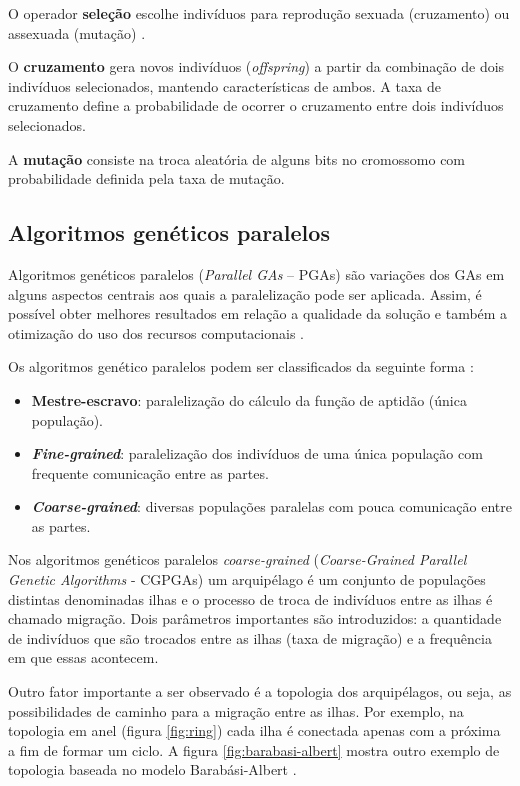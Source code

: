 O operador \textbf{seleção} escolhe indivíduos para reprodução sexuada (cruzamento) ou assexuada (mutação) \cite{erik2012geneticos}.

O \textbf{cruzamento} gera novos indivíduos (\textit{offspring}) a partir da combinação de dois indivíduos selecionados, mantendo características de ambos. A taxa de cruzamento define a probabilidade de ocorrer o cruzamento entre dois indivíduos selecionados.

A \textbf{mutação} consiste na troca aleatória de alguns bits no cromossomo com probabilidade definida pela taxa de mutação.

\subsection{Algoritmos genéticos paralelos}

Algoritmos genéticos paralelos (\textit{Parallel GAs} -- PGAs) \cite{shonkwiler1993parallel} são variações dos GAs em alguns aspectos centrais aos quais a paralelização pode ser aplicada. Assim, é possível obter melhores resultados em relação a qualidade da solução e também a otimização do uso dos recursos computacionais \cite{erik2012geneticos}.

Os algoritmos genético paralelos podem ser classificados da seguinte forma \cite{cantupaz1998asurvey}:

\begin{itemize}
    \item \textbf{Mestre-escravo}: paralelização do cálculo da função de aptidão (única população).
    \item \textbf{\textit{Fine-grained}}: paralelização dos indivíduos de uma única população com frequente comunicação entre as partes.
    \item \textbf{\textit{Coarse-grained}}: diversas populações paralelas com pouca comunicação entre as partes.
\end{itemize}

Nos algoritmos genéticos paralelos \textit{coarse-grained} (\textit{Coarse-Grained Parallel Genetic Algorithms} - CGPGAs) um arquipélago é um conjunto de populações distintas denominadas ilhas e o processo de troca de indivíduos entre as ilhas é chamado migração. Dois parâmetros importantes são introduzidos: a quantidade de indivíduos que são trocados entre as ilhas (taxa de migração) e a frequência em que essas acontecem.

Outro fator importante a ser observado é a topologia dos arquipélagos, ou seja, as possibilidades de caminho para a migração entre as ilhas. Por exemplo, na topologia em anel (figura \ref{fig:ring}) cada ilha é conectada apenas com a próxima a fim de formar um ciclo. A figura \ref{fig:barabasi-albert} mostra outro exemplo de topologia baseada no modelo Barabási-Albert \cite{albert2002statistical}.

